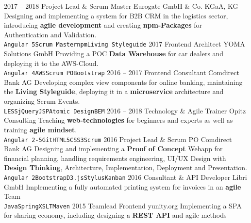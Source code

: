 \documentclass[9pt]{developercv} %
\begin{document}
\begin{entrylist}
  \entry
		{2017 -- 2018}
		{Project Lead \& Scrum Master}
		{Eurogate GmbH \& Co. KGaA, KG}
		{
      Designing and implementing a system for B2B CRM in the logistics sector, introducing \textbf{agile development} and 
      creating \textbf{npm-Packages} for Authentication and Validation.\\ 
      \texttt{Angular 5}\slashsep\texttt{Scrum Master}\slashsep\texttt{npm}\slashsep\texttt{Living Styleguide}
    }
  \entry
		{2017}
		{Frontend Architect}
		{YOMA Solutions GmbH}
		{
      Providing a POC \textbf{Data Warehouse} for car dealers and deploying it to the AWS-Cloud.\\
      \texttt{Angular 4}\slashsep\texttt{AWS}\slashsep\texttt{Scrum PO}\slashsep\texttt{Bootstrap}
    }
  \entry
		{2016 -- 2017}
		{Frontend Consultant}
		{Comdirect Bank AG}
		{
      Developing complex view components for online banking, maintaining the \textbf{Living Styleguide},
      deploying it in a \textbf{microservice} architecture and organizing Scrum Events.\\
      \texttt{LESS}\slashsep\texttt{jQuery}\slashsep\texttt{JSP}\slashsep\texttt{Atomic Design}\slashsep\texttt{BEM}
    }
\entry
		{2016 -- 2018}
		{Technology \& Agile Trainer}
		{Opitz Consulting}
		{
      Teaching \textbf{web-technologies} for beginners and experts as well as training \textbf{agile mindset}.\\
      \texttt{Angular 2-5}\slashsep\texttt{Git}\slashsep\texttt{HTML5}\slashsep\texttt{CSS3}\slashsep\texttt{Scrum}
    }
  \entry
		{2016}
		{Project Lead \& Scrum PO}
		{Comdirect Bank AG}
		{
      Designing and implementing a \textbf{Proof of Concept} Webapp for financial planning, handling
      requirements engineering, UI/UX Design with \textbf{Design Thinking}, Architecture, Implementation, Deployment
      and Presentation.\\
      \texttt{Angular 2}\slashsep\texttt{Bootstrap}\slashsep\texttt{D3.js}\slashsep\texttt{Stylus}\slashsep\texttt{Kanban}
    }
  \entry
		{2016}
		{Consultant \& API Developer}
		{Libri GmbH}
		{
      Implementing a fully automated printing system for invoices in an \textbf{agile} Team\\
      \texttt{Java}\slashsep\texttt{Spring}\slashsep\texttt{XSLT}\slashsep\texttt{Maven}
    }
  \entry
		{2015}
		{Teamlead Frontend}
		{yunity.org}
		{
      Implementing a SPA for sharing economy, including designing a \textbf{REST API} and agile methods\\
}
\end{entrylist}
\end{document}
